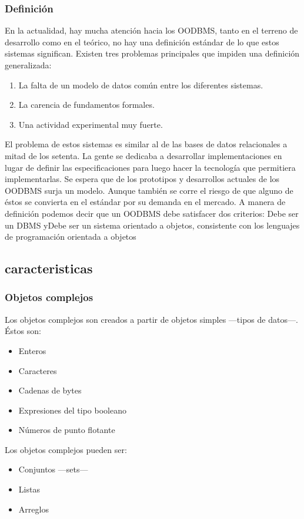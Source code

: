 \documentclass[12pts, A3 ,twosides]{article}
\begin{document}
\subsubsection{Definición}
En la actualidad, hay mucha atención hacia los OODBMS, tanto en el terreno de desarrollo como en el teórico, no hay una definición estándar de lo que estos sistemas significan. Existen tres problemas principales que impiden una definición generalizada: 
\begin{enumerate}
\item La falta de un modelo de datos común entre los diferentes sistemas.
\item La carencia de fundamentos formales.
\item Una actividad experimental muy fuerte.
\end{enumerate}
El problema de estos sistemas es similar al de las bases de datos relacionales a mitad de los setenta. La gente se dedicaba a desarrollar implementaciones en lugar de definir las especificaciones para luego hacer la tecnología que permitiera implementarlas. Se espera que de los prototipos y desarrollos actuales de los OODBMS surja un modelo. Aunque también se corre el riesgo de que alguno de éstos se convierta en el estándar por su demanda en el mercado. A manera de definición podemos decir que un OODBMS debe satisfacer dos criterios: Debe ser un DBMS yDebe ser un sistema orientado a objetos, consistente con los lenguajes de programación orientada a objetos 

\subsection{caracteristicas}
\subsubsection{Objetos complejos}
Los objetos complejos son creados a partir de objetos simples —tipos de datos—. Éstos son:
\begin{itemize}
\item Enteros
\item Caracteres
\item Cadenas de bytes
\item Expresiones del tipo booleano
\item Números de punto flotante
\end{itemize}

Los objetos complejos pueden ser:
\begin{itemize}
\item Conjuntos —sets—
\item Listas
\item Arreglos
\end{itemize}
\end{document}
